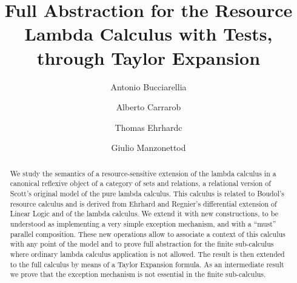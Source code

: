 \documentclass{LMCS}
\begin{document}
\title[Full Abstraction for Resource Calculi]{Full Abstraction for the Resource Lambda Calculus with Tests, through Taylor Expansion\rsuper*}

\author[A.~Bucciarelli]{Antonio Bucciarelli\rsuper a}	\address{{\lsuper a}Univ Paris Diderot, Sorbonne Paris Cit\'e, PPS, UMR 7126, CNRS, F-75205 Paris, France}	  

\author[A.~Carrano]{Alberto Carraro\rsuper b}	\address{{\lsuper b}Universit\`a Ca'Foscari,  Via Torino 155, 30172 Mestre, Venice, Italia}	  

\author[T.~Ehrhard]{Thomas Ehrhard\rsuper c}	\address{{\lsuper c}CNRS, PPS, UMR 7126, Univ Paris Diderot, Sorbonne Paris Cit\'e, F-75205 Paris, France}	  

\author[G.~Manzonetto]{Giulio Manzonetto\rsuper d}	\address{{\lsuper d}Univ Paris 13, Sorbonne Paris Cit\'e, LIPN, UMR 7030, CNRS, F-93430 Villetaneuse, France}	  







\begin{abstract}
 \noindent  We study the semantics of a resource-sensitive extension of the lambda calculus in a canonical reflexive object of a category of sets and relations, a relational version of Scott's
original model of the pure lambda calculus. This calculus is related to Boudol's resource calculus and is derived from Ehrhard and Regnier's differential extension of Linear Logic and of the lambda calculus.  We extend it with new constructions, to be understood as implementing a very simple exception mechanism, and with a ``must'' parallel composition. These new operations allow to associate a context of this calculus with any point of the model and to prove full abstraction for the finite sub-calculus where ordinary lambda calculus application is not allowed. The result is then extended to the full calculus by means of a Taylor Expansion formula.
As an intermediate result we prove that the exception mechanism is not essential in the finite sub-calculus. \end{abstract}
\end{document}

